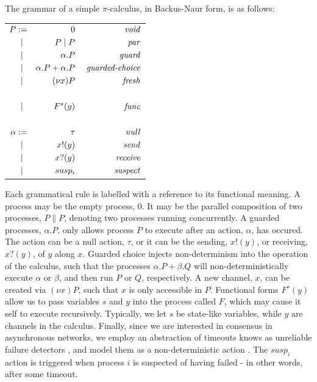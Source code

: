 The grammar of a simple $\pi$-calculus, in Backus-Naur form, is as follows:


\begin{center}
	\begin{tabular}{l }
		{$\!\begin{aligned}
			P & := & 0  & & \text{ \emph{void}}\\
			    & \; \| & P \| P  & & \text{ \emph{par}} \\
			    & \; \| & \alpha.P  & & \text{ \emph{guard}} \\
			    & \; \| & \alpha.P  + \alpha.P & & \text{ \emph{guarded-choice}} \\
			    & \; \| & (\nu x) P & & \text{ \emph{fresh}}\\ \\
			    & \; \| & F^{s}(y) & & \text{ \emph{func}}\\ \\

			\alpha & := & \tau & & \text{ \emph{null}} \\
			    & \; \| & x!(y) & & \text{ \emph{send}} \\
			    & \; \| & x?(y) & & \text{ \emph{receive}}\\
			    & \; \| & susp_i & & \text{ \emph{suspect}}\\
		\end{aligned}$} \\ 
	\end{tabular}
\end{center}

Each grammatical rule is labelled with a reference to its functional meaning.
A process may be the empty process, $0$.
It may be the parallel composition of two processes, $P \| P$,
denoting two processes running concurrently.
A guarded processes, $\alpha.P$, only allows process $P$ to execute after an action, $\alpha$,
has occured.
The action can be a null action, $\tau$, or it can be the sending, $x!(y)$, 
or receiving, $x?(y)$, of $y$ along $x$.
Guarded choice injects non-determinism into the operation of the calculus, 
such that the processes $\alpha.P + \beta.Q$ will non-deterministically execute
$\alpha$ or $\beta$, and then run $P$ or $Q$, respectively.
A new channel, $x$, can be created via $(\nu x) P$, such that $x$ is only accessible in $P$.
Functional forms $F^{s}(y)$ allow us to pass variables $s$ and $y$ into 
the process called $F$, which may cause it self to execute recursively. 
Typically, we let $s$ be state-like variables, while $y$ are channels in the calculus.
Finally, since we are interested in consensus in asynchronous networks, 
we employ an abstraction of timeouts knows as unreliable failure detectors \cite{chandra1996unreliable},
and model them as a non-deterministic action \cite{nestmann2003modeling}.
The $susp_i$ action is triggered when process $i$ is suspected of having failed -
in other words, after some timeout.

